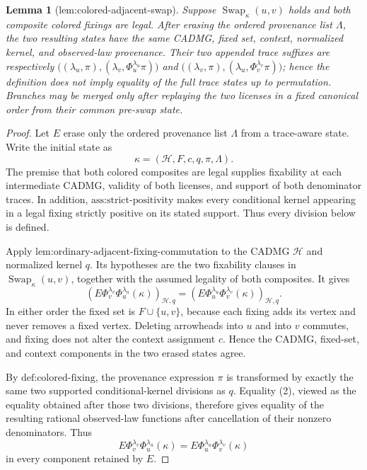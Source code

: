 \documentclass{article}
\newtheorem{lemma}{Lemma}
\begin{document}
\begin{lemma}[lem:colored-adjacent-swap]\label{lem:colored-adjacent-swap}
Suppose \(\operatorname{Swap}_{\kappa}(u,v)\) holds and both composite colored fixings are legal. After erasing the ordered provenance list \(\Lambda\), the two resulting states have the same CADMG, fixed set, context, normalized kernel, and observed-law provenance. Their two appended trace suffixes are respectively \(\bigl((\lambda_u,\pi),(\lambda_v,\Phi_u^{\lambda_u}\pi)\bigr)\) and \(\bigl((\lambda_v,\pi),(\lambda_u,\Phi_v^{\lambda_v}\pi)\bigr)\); hence the definition does not imply equality of the full trace states up to permutation. Branches may be merged only after replaying the two licenses in a fixed canonical order from their common pre-swap state.
\end{lemma}
\begin{proof}
Let \(E\) erase only the ordered provenance list \(\Lambda\) from a trace-aware state.  Write the initial state as
\[
\kappa=(\mathcal H,F,c,q,\pi,\Lambda).
\tag{1}
\]
The premise that both colored composites are legal supplies fixability at each intermediate CADMG, validity of both licenses, and support of both denominator traces.  In addition, \(\text{ass:strict-positivity}\) makes every conditional kernel appearing in a legal fixing strictly positive on its stated support.  Thus every division below is defined.

Apply \(\text{lem:ordinary-adjacent-fixing-commutation}\) to the CADMG \(\mathcal H\) and normalized kernel \(q\).  Its hypotheses are the two fixability clauses in \(\operatorname{Swap}_{\kappa}(u,v)\), together with the assumed legality of both composites.  It gives
\[
\left(E\Phi_v^{\lambda_v}\Phi_u^{\lambda_u}(\kappa)\right)_{\mathcal H,q}
=
\left(E\Phi_u^{\lambda_u}\Phi_v^{\lambda_v}(\kappa)\right)_{\mathcal H,q}.
\tag{2}
\]
In either order the fixed set is \(F\cup\{u,v\}\), because each fixing adds its vertex and never removes a fixed vertex.  Deleting arrowheads into \(u\) and into \(v\) commutes, and fixing does not alter the context assignment \(c\).  Hence the CADMG, fixed-set, and context components in the two erased states agree.

By \(\text{def:colored-fixing}\), the provenance expression \(\pi\) is transformed by exactly the same two supported conditional-kernel divisions as \(q\).  Equality (2), viewed as the equality obtained after those two divisions, therefore gives equality of the resulting rational observed-law functions after cancellation of their nonzero denominators.  Thus
\[
E\Phi_v^{\lambda_v}\Phi_u^{\lambda_u}(\kappa)
=
E\Phi_u^{\lambda_u}\Phi_v^{\lambda_v}(\kappa)
\tag{3}
\]
in every component retained by \(E\).


\end{proof}
\end{document}
